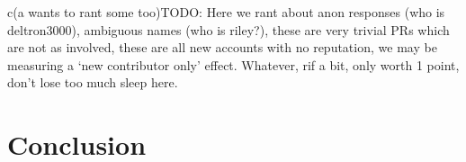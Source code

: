 \documentclass[journal,12pt,onecolumn,]{IEEEtran}
\begin{document}
c(a wants to rant some too)TODO: Here we rant about anon responses (who is deltron3000), ambiguous names (who is riley?), these are very trivial PRs which are not as involved, these are all new accounts with no reputation, we may be measuring a `new contributor only' effect.  Whatever, rif a bit, only worth 1 point, don't lose too much sleep here.

\section{Conclusion}
%



\end{document}
